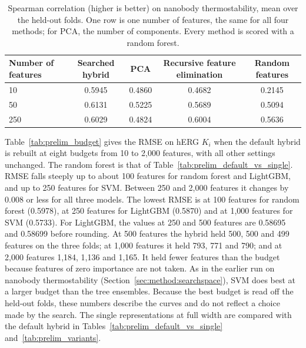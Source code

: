 \begin{table}[htbp]
\centering
\small
\begin{tabular}{@{}lcccc@{}}
\toprule
Number of features & Searched hybrid & PCA & Recursive feature elimination & Random features \\
\midrule
10 & 0.5945 & 0.4860 & 0.4682 & 0.2145 \\
50 & 0.6131 & 0.5225 & 0.5689 & 0.5094 \\
250 & 0.6029 & 0.4824 & 0.6004 & 0.5636 \\
\bottomrule
\end{tabular}
\caption[The searched hybrid against PCA, recursive feature elimination and random features on nanobody thermostability]{Spearman correlation (higher is better) on nanobody thermostability, mean over the held-out folds. One row is one number of features, the same for all four methods; for PCA, the number of components. Every method is scored with a random forest.}
\label{tab:prelim_reduction_nanobody}
\end{table}

Table~\ref{tab:prelim_budget} gives the RMSE on hERG $K_i$ when the default hybrid is rebuilt at eight budgets from 10 to 2,000 features, with all other settings unchanged. The random forest is that of Table~\ref{tab:prelim_default_vs_single}. RMSE falls steeply up to about 100 features for random forest and LightGBM, and up to 250 features for SVM. Between 250 and 2,000 features it changes by 0.008 or less for all three models. The lowest RMSE is at 100 features for random forest (0.5978), at 250 features for LightGBM (0.5870) and at 1,000 features for SVM (0.5733). For LightGBM, the values at 250 and 500 features are 0.58695 and 0.58699 before rounding. At 500 features the hybrid held 500, 500 and 499 features on the three folds; at 1,000 features it held 793, 771 and 790; and at 2,000 features 1,184, 1,136 and 1,165. It held fewer features than the budget because features of zero importance are not taken. As in the earlier run on nanobody thermostability (Section~\ref{sec:method:searchspace}), SVM does best at a larger budget than the tree ensembles. Because the best budget is read off the held-out folds, these numbers describe the curves and do not reflect a choice made by the search. The single representations at full width are compared with the default hybrid in Tables~\ref{tab:prelim_default_vs_single} and~\ref{tab:prelim_variants}.

